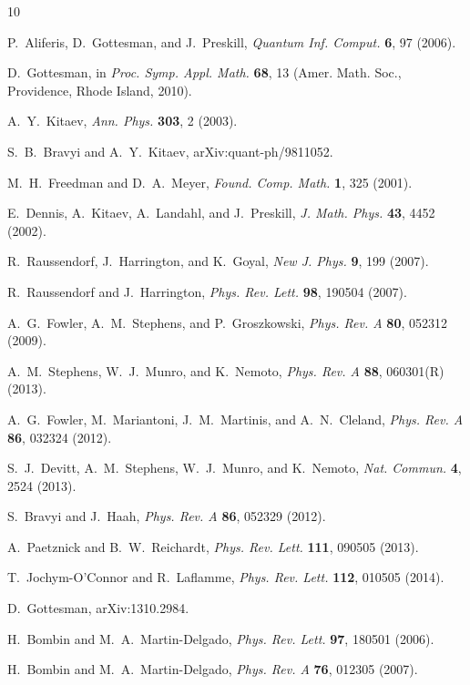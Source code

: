 \documentclass[letterpaper,showpacs,superscriptaddress,twocolumn,aps,prl]{revtex4-1}
\begin{document}

\begin{thebibliography}{10}

P.~Aliferis, D.~Gottesman, and J.~Preskill, {\it Quantum Inf. Comput.} \textbf{6}, 97 (2006).

D.~Gottesman, in {\it Proc. Symp. Appl. Math.} {\bf 68}, 13 (Amer. Math. Soc., Providence, Rhode Island, 2010).

A.~Y.~Kitaev, {\it Ann. Phys.} {\bf 303}, 2 (2003).

S.~B.~Bravyi and A.~Y.~Kitaev, arXiv:quant-ph/9811052.

M.~H.~Freedman and D.~A.~Meyer, {\it Found. Comp. Math.} {\bf 1}, 325 (2001).

E.~Dennis, A.~Kitaev, A.~Landahl, and J.~Preskill, {\it J. Math. Phys.} {\bf 43}, 4452 (2002).

R.~Raussendorf, J.~Harrington, and K.~Goyal, {\it New J. Phys.} {\bf 9}, 199 (2007).

R.~Raussendorf and J.~Harrington, {\it Phys. Rev. Lett.} {\bf 98}, 190504 (2007).

A.~G.~Fowler, A.~M.~Stephens, and P.~Groszkowski, {\it Phys. Rev. A} \textbf{80}, 052312 (2009).

A.~M.~Stephens, W.~J.~Munro, and K.~Nemoto, {\it Phys. Rev. A} \textbf{88}, 060301(R) (2013).

A.~G.~Fowler, M.~Mariantoni, J.~M.~Martinis, and A.~N.~Cleland, {\it Phys. Rev. A} \textbf{86}, 032324 (2012).

S.~J.~Devitt, A.~M.~Stephens, W.~J.~Munro, and K.~Nemoto, {\it Nat. Commun.} \textbf{4}, 2524 (2013).

S.~Bravyi and J.~Haah, {\it Phys. Rev. A} {\bf 86}, 052329 (2012).

A.~Paetznick and B.~W.~Reichardt, {\it Phys. Rev. Lett.} {\bf 111}, 090505 (2013).

T.~Jochym-O'Connor and R.~Laflamme, {\it Phys. Rev. Lett.} {\bf 112}, 010505 (2014).

D.~Gottesman, arXiv:1310.2984.

H.~Bombin and M.~A.~Martin-Delgado, {\it Phys. Rev. Lett.} {\bf 97}, 180501 (2006).

H.~Bombin and M.~A.~Martin-Delgado, {\it Phys. Rev. A} {\bf 76}, 012305 (2007).


\end{thebibliography}
\end{document}
